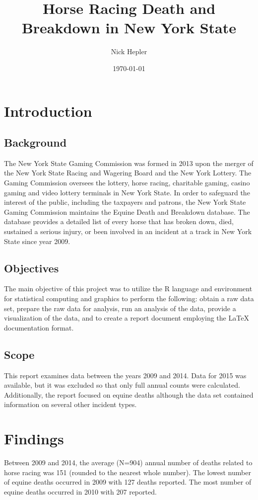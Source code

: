 \documentclass[oneside]{article}
\title{Horse Racing Death and Breakdown in New York State}
\author{Nick Hepler}
\date{\today}
\begin{document}
\maketitle 

\section{Introduction}

\subsection{Background}
The New York State Gaming Commission was formed in 2013 upon the merger of the New York State Racing and Wagering Board and the New York Lottery. The Gaming Commission oversees the lottery, horse racing, charitable gaming, casino gaming and video lottery terminals in New York State. In order to safeguard the interest of the public, including the taxpayers and patrons, the New York State Gaming Commission maintains the Equine Death and Breakdown database. The database provides a detailed list of every horse that has broken down, died, sustained a serious injury, or been involved in an incident at a track in New York State since year 2009.

\subsection{Objectives}
The main objective of this project was to utilize the R language and environment for statistical computing and graphics to perform the following: obtain a raw data set, prepare the raw data for analysis, run an analysis of the data, provide a visualization of the data, and to create a report document employing the LaTeX documentation format.

\subsection{Scope}
This report examines data between the years 2009 and 2014. Data for 2015 was available, but it was excluded so that only full annual counts were calculated. Additionally, the report focused on equine deaths although the data set contained information on several other incident types.

\section{Findings}
Between 2009 and 2014, the average (N=904) annual number of deaths related to horse racing was 151 (rounded to the nearest whole number). The lowest number of equine deaths occurred in 2009 with 127 deaths reported. The most number of equine deaths occurred in 2010 with 207 reported.
\end{document}
